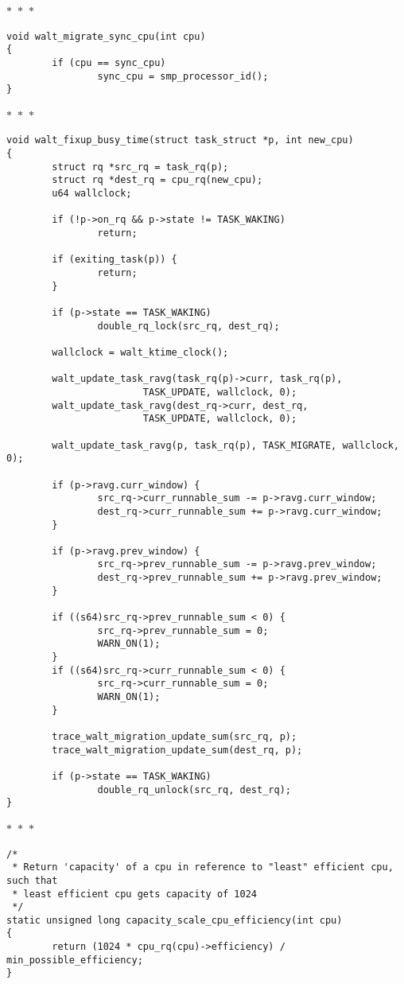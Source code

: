 \documentclass{article}
\newcommand{\divider}{{\begin{center}
  $\ast$~$\ast$~$\ast$
\end{center}}}
\begin{document}
\divider
\begin{verbatim}
void walt_migrate_sync_cpu(int cpu)
{
        if (cpu == sync_cpu)
                sync_cpu = smp_processor_id();
}
\end{verbatim}
\divider
\begin{verbatim}
void walt_fixup_busy_time(struct task_struct *p, int new_cpu)
{
        struct rq *src_rq = task_rq(p);
        struct rq *dest_rq = cpu_rq(new_cpu);
        u64 wallclock;

        if (!p->on_rq && p->state != TASK_WAKING)
                return;

        if (exiting_task(p)) {
                return;
        }

        if (p->state == TASK_WAKING)
                double_rq_lock(src_rq, dest_rq);

        wallclock = walt_ktime_clock();

        walt_update_task_ravg(task_rq(p)->curr, task_rq(p),
                        TASK_UPDATE, wallclock, 0);
        walt_update_task_ravg(dest_rq->curr, dest_rq,
                        TASK_UPDATE, wallclock, 0);

        walt_update_task_ravg(p, task_rq(p), TASK_MIGRATE, wallclock, 0);

        if (p->ravg.curr_window) {
                src_rq->curr_runnable_sum -= p->ravg.curr_window;
                dest_rq->curr_runnable_sum += p->ravg.curr_window;
        }

        if (p->ravg.prev_window) {
                src_rq->prev_runnable_sum -= p->ravg.prev_window;
                dest_rq->prev_runnable_sum += p->ravg.prev_window;
        }

        if ((s64)src_rq->prev_runnable_sum < 0) {
                src_rq->prev_runnable_sum = 0;
                WARN_ON(1);
        }
        if ((s64)src_rq->curr_runnable_sum < 0) {
                src_rq->curr_runnable_sum = 0;
                WARN_ON(1);
        }

        trace_walt_migration_update_sum(src_rq, p);
        trace_walt_migration_update_sum(dest_rq, p);

        if (p->state == TASK_WAKING)
                double_rq_unlock(src_rq, dest_rq);
}
\end{verbatim}
\divider
\begin{verbatim}
/*
 * Return 'capacity' of a cpu in reference to "least" efficient cpu, such that
 * least efficient cpu gets capacity of 1024
 */
static unsigned long capacity_scale_cpu_efficiency(int cpu)
{
        return (1024 * cpu_rq(cpu)->efficiency) / min_possible_efficiency;
}
\end{verbatim}
\end{document}
